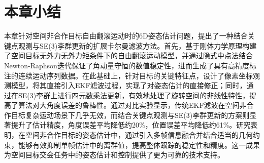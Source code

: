 \section{本章小结}

本章针对空间非合作目标自由翻滚运动时的6D姿态估计问题，提出了一种结合关键点观测与SE(3)李群更新的扩展卡尔曼滤波方法。首先，基于刚体力学原理构建了空间目标无外力无外力矩条件下的自由翻滚运动模型，并通过隐式中点法结合Newton-Raphson迭代保证了角动量守恒的数值稳定性，进而生成了具有高精度标注的连续运动序列数据。在此基础上，针对目标的关键特征点，设计了像素坐标观测模型，将其直接引入EKF滤波过程，实现了对姿态估计的直接修正；同时，通过在SE(3)李群上进行四元数乘法更新，有效地处理了旋转空间的非线性特性，提高了算法对大角度误差的鲁棒性。通过对比实验显示，传统EKF滤波在空间非合作目标复杂运动场景下几乎无效，而结合关键点观测与SE(3)李群更新的方案则显著提升了估计精度，角度误差平均降低约20\%，位置误差平均降低约61\%。研究表明，在空间非合作目标的姿态估计中，通过引入多帧信息融合并结合适当的几何约束，能够有效抑制单帧估计中的离群值，提高整体跟踪的稳定性和精度。这一成果为空间目标交会任务中的姿态估计和控制提供了更为可靠的技术支持。




